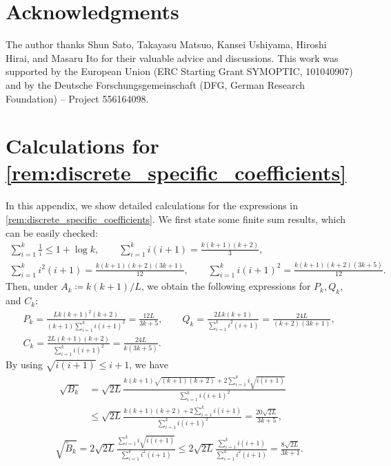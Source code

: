 \documentclass[11pt,a4paper]{article}
\theoremstyle{definition}
\theoremstyle{plain}
\begin{document}
\section*{Acknowledgments}
The author thanks Shun Sato, Takayasu Matsuo, Kansei Ushiyama, Hiroshi Hirai, and Masaru Ito for their valuable advice and discussions.
This work was supported by the European Union (ERC Starting Grant SYMOPTIC, 101040907) and by the Deutsche Forschungsgemeinschaft (DFG, German Research Foundation) -- Project 556164098.

\printbibliography

\appendix

\section{Calculations for \texorpdfstring{\cref{rem:discrete_specific_coefficients}}{Remark \ref{rem:discrete_specific_coefficients}}}\label{app:coefficients}
    In this appendix, we show detailed calculations for the expressions in \cref{rem:discrete_specific_coefficients}.
    We first state some finite sum results, which can be easily checked:
    \begin{gather*}
        \sum_{i = 1}^k\frac1i \le 1 + \log k,\qquad \sum_{i = 1}^ki(i + 1) = \frac{k(k + 1)(k + 2)}3,\\
        \sum_{i = 1}^ki^2(i + 1) = \frac{k(k + 1)(k + 2)(3k + 1)}{12},\qquad \sum_{i = 1}^ki(i + 1)^2 = \frac{k(k + 1)(k + 2)(3k + 5)}{12}.
    \end{gather*}
    Then, under $A_k \coloneqq k(k + 1)/L$, we obtain the following expressions for $P_k, Q_k$, and $C_k$:
    \begin{gather*}
        P_k = \frac{Lk(k + 1)^2(k + 2)}{(k + 1)\sum_{i = 1}^ki(i + 1)^2} = \frac{12L}{3k + 5},\qquad
        Q_k = \frac{2Lk(k + 1)}{\sum_{i = 1}^ki^2(i + 1)} = \frac{24L}{(k + 2)(3k + 1)},\\
        C_k = \frac{2L(k + 1)(k + 2)}{\sum_{i = 1}^ki(i + 1)^2} = \frac{24L}{k(3k + 5)}.
    \end{gather*}
    By using $\sqrt{i(i+ 1)} \le i + 1$, we have
    \begin{gather*}
        \begin{aligned}
            \sqrt{B_k} &= \sqrt{2L}\frac{k(k + 1)\sqrt{(k + 1)(k + 2)} + 2\sum_{i = 1}^ki\sqrt{i(i + 1)}}{\sum_{i = 1}^ki(i + 1)^2}\\
            &\le \sqrt{2L}\frac{k(k + 1)(k + 2) + 2\sum_{i = 1}^ki(i + 1)}{\sum_{i = 1}^ki(i + 1)^2} = \frac{20\sqrt{2L}}{3k + 5},
        \end{aligned}\\
        \sqrt{\tilde B_k} = 2\sqrt{2L}\frac{\sum_{i = 1}^ki\sqrt{i(i + 1)}}{\sum_{i = 1}^ki^2(i + 1)} \le 2\sqrt{2L}\frac{\sum_{i = 1}^ki(i + 1)}{\sum_{i = 1}^ki^2(i + 1)} = \frac{8\sqrt{2L}}{3k + 1}.
    \end{gather*}
\end{document}
